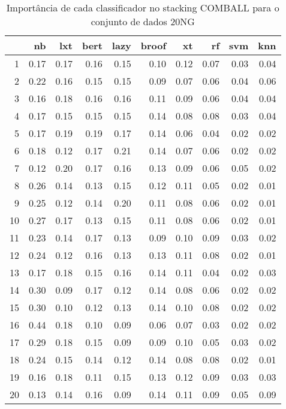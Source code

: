 \documentclass[]{article}
\begin{document}
\begin{table}[ht]
\centering
\begin{tabular}{rrrrrrrrrr}
  \hline
 & nb & lxt & bert & lazy & broof & xt & rf & svm & knn \\ 
  \hline
1 & 0.17 & 0.17 & 0.16 & 0.15 & 0.10 & 0.12 & 0.07 & 0.03 & 0.04 \\ 
  2 & 0.22 & 0.16 & 0.15 & 0.15 & 0.09 & 0.07 & 0.06 & 0.04 & 0.06 \\ 
  3 & 0.16 & 0.18 & 0.16 & 0.16 & 0.11 & 0.09 & 0.06 & 0.04 & 0.04 \\ 
  4 & 0.17 & 0.15 & 0.15 & 0.15 & 0.14 & 0.08 & 0.08 & 0.03 & 0.04 \\ 
  5 & 0.17 & 0.19 & 0.19 & 0.17 & 0.14 & 0.06 & 0.04 & 0.02 & 0.02 \\ 
  6 & 0.18 & 0.12 & 0.17 & 0.21 & 0.14 & 0.07 & 0.06 & 0.02 & 0.02 \\ 
  7 & 0.12 & 0.20 & 0.17 & 0.16 & 0.13 & 0.09 & 0.06 & 0.05 & 0.02 \\ 
  8 & 0.26 & 0.14 & 0.13 & 0.15 & 0.12 & 0.11 & 0.05 & 0.02 & 0.01 \\ 
  9 & 0.25 & 0.12 & 0.14 & 0.20 & 0.11 & 0.08 & 0.06 & 0.02 & 0.01 \\ 
  10 & 0.27 & 0.17 & 0.13 & 0.15 & 0.11 & 0.08 & 0.06 & 0.02 & 0.01 \\ 
  11 & 0.23 & 0.14 & 0.17 & 0.13 & 0.09 & 0.10 & 0.09 & 0.03 & 0.02 \\ 
  12 & 0.24 & 0.12 & 0.16 & 0.13 & 0.13 & 0.11 & 0.08 & 0.02 & 0.01 \\ 
  13 & 0.17 & 0.18 & 0.15 & 0.16 & 0.14 & 0.11 & 0.04 & 0.02 & 0.03 \\ 
  14 & 0.30 & 0.09 & 0.17 & 0.12 & 0.14 & 0.08 & 0.06 & 0.02 & 0.02 \\ 
  15 & 0.30 & 0.10 & 0.12 & 0.13 & 0.14 & 0.10 & 0.08 & 0.02 & 0.02 \\ 
  16 & 0.44 & 0.18 & 0.10 & 0.09 & 0.06 & 0.07 & 0.03 & 0.02 & 0.02 \\ 
  17 & 0.29 & 0.18 & 0.15 & 0.09 & 0.09 & 0.10 & 0.05 & 0.03 & 0.02 \\ 
  18 & 0.24 & 0.15 & 0.14 & 0.12 & 0.14 & 0.08 & 0.08 & 0.02 & 0.01 \\ 
  19 & 0.16 & 0.18 & 0.11 & 0.15 & 0.13 & 0.12 & 0.09 & 0.03 & 0.03 \\ 
  20 & 0.13 & 0.14 & 0.16 & 0.09 & 0.14 & 0.11 & 0.09 & 0.05 & 0.09 \\ 
   \hline
\end{tabular}
\caption{Importância de cada classificador no stacking COMBALL para o conjunto de dados 20NG} 
\label{tab:imp20ng}
\end{table}
\end{document}
